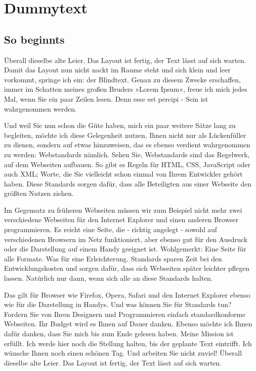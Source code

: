 \chapter{Dummytext}

\section{So beginnts}
Überall dieselbe alte Leier. Das Layout ist fertig, der Text lässt auf sich warten. Damit das Layout nun nicht nackt im Raume steht und sich klein und leer vorkommt, springe ich ein: der Blindtext. Genau zu diesem Zwecke erschaffen, immer im Schatten meines großen Bruders »Lorem Ipsum«, freue ich mich jedes Mal, wenn Sie ein paar Zeilen lesen. Denn esse est percipi - Sein ist wahrgenommen werden.

Und weil Sie nun schon die Güte haben, mich ein paar weitere Sätze lang zu begleiten, möchte ich diese Gelegenheit nutzen, Ihnen nicht nur als Lückenfüller zu dienen, sondern auf etwas hinzuweisen, das es ebenso verdient wahrgenommen zu werden: Webstandards nämlich. Sehen Sie, Webstandards sind das Regelwerk, auf dem Webseiten aufbauen. So gibt es Regeln für HTML, CSS, JavaScript oder auch XML; Worte, die Sie vielleicht schon einmal von Ihrem Entwickler gehört haben. Diese Standards sorgen dafür, dass alle Beteiligten aus einer Webseite den größten Nutzen ziehen.

Im Gegensatz zu früheren Webseiten müssen wir zum Beispiel nicht mehr zwei verschiedene Webseiten für den Internet Explorer und einen anderen Browser programmieren. Es reicht eine Seite, die - richtig angelegt - sowohl auf verschiedenen Browsern im Netz funktioniert, aber ebenso gut für den Ausdruck oder die Darstellung auf einem Handy geeignet ist. Wohlgemerkt: Eine Seite für alle Formate. Was für eine Erleichterung. Standards sparen Zeit bei den Entwicklungskosten und sorgen dafür, dass sich Webseiten später leichter pflegen lassen. Natürlich nur dann, wenn sich alle an diese Standards halten.

Das gilt für Browser wie Firefox, Opera, Safari und den Internet Explorer ebenso wie für die Darstellung in Handys. Und was können Sie für Standards tun? Fordern Sie von Ihren Designern und Programmieren einfach standardkonforme Webseiten. Ihr Budget wird es Ihnen auf Dauer danken. Ebenso möchte ich Ihnen dafür danken, dass Sie mich bis zum Ende gelesen haben. Meine Mission ist erfüllt. Ich werde hier noch die Stellung halten, bis der geplante Text eintrifft. Ich wünsche Ihnen noch einen schönen Tag. Und arbeiten Sie nicht zuviel! Überall dieselbe alte Leier. Das Layout ist fertig, der Text lässt auf sich warten.

